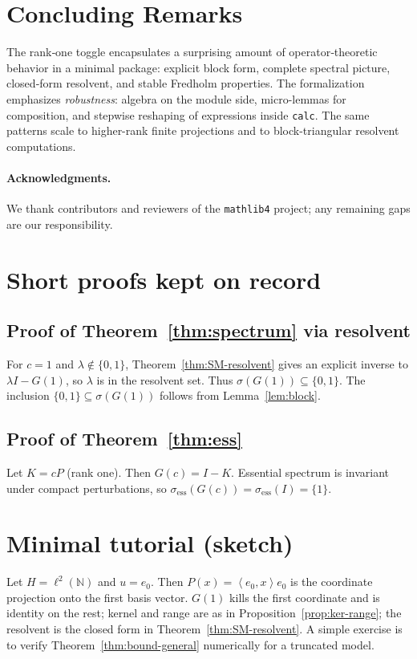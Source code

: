 \documentclass[11pt]{article}
\theoremstyle{definition}
\newcommand{\ip}[2]{\left\langle #1,#2\right\rangle}
\begin{document}
\section{Concluding Remarks}

The rank‑one toggle encapsulates a surprising amount of operator‑theoretic behavior in a minimal package: explicit block form, complete spectral picture, closed‑form resolvent, and stable Fredholm properties.
The formalization emphasizes \emph{robustness}: algebra on the module side, micro-lemmas for composition, and stepwise reshaping of expressions inside \texttt{calc}.
The same patterns scale to higher-rank finite projections and to block-triangular resolvent computations.

\paragraph{Acknowledgments.}
We thank contributors and reviewers of the \texttt{mathlib4} project; any remaining gaps are our responsibility.

\appendix

\section{Short proofs kept on record}

\subsection*{Proof of Theorem~\ref{thm:spectrum} via resolvent}
For $c=1$ and $\lambda\notin\{0,1\}$, Theorem~\ref{thm:SM-resolvent} gives an explicit inverse to $\lambda I - G(1)$, so $\lambda$ is in the resolvent set. Thus $\sigma(G(1))\subseteq\{0,1\}$. The inclusion $\{0,1\}\subseteq\sigma(G(1))$ follows from Lemma~\ref{lem:block}.

\subsection*{Proof of Theorem~\ref{thm:ess}}
Let $K=cP$ (rank one). Then $G(c)=I-K$. Essential spectrum is invariant under compact perturbations, so $\sigma_{\mathrm{ess}}(G(c))=\sigma_{\mathrm{ess}}(I)=\{1\}$.

\section{Minimal tutorial (sketch)}

Let $H=\ell^2(\mathbb{N})$ and $u=e_0$. Then $P(x)=\ip{e_0}{x}e_0$ is the coordinate projection onto the first basis vector. $G(1)$ kills the first coordinate and is identity on the rest; kernel and range are as in Proposition~\ref{prop:ker-range}; the resolvent is the closed form in Theorem~\ref{thm:SM-resolvent}. A simple exercise is to verify Theorem~\ref{thm:bound-general} numerically for a truncated model.
\end{document}
